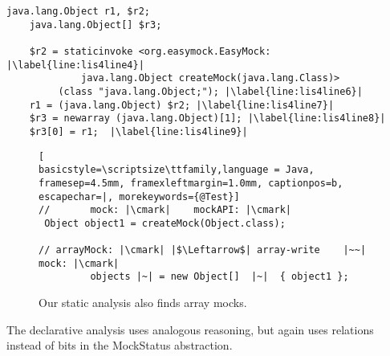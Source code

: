 \begin{lstlisting}[basicstyle=\ttfamily, caption={Jimple Intermediate Representation for the array in Figure~\ref{fig:arrayMockIllustration}.},
basicstyle=\scriptsize\ttfamily, framesep=4.5mm, framexleftmargin=1.0mm, captionpos=b, label=lis:arrayIllustrationIR, escapechar=|, morekeywords={@Test, specialinvoke, virtualinvoke, staticinvoke, newarray}]
	java.lang.Object r1, $r2;
	java.lang.Object[] $r3;
	
	$r2 = staticinvoke <org.easymock.EasyMock: |\label{line:lis4line4}|
	         java.lang.Object createMock(java.lang.Class)>
	     (class "java.lang.Object;"); |\label{line:lis4line6}|
	r1 = (java.lang.Object) $r2; |\label{line:lis4line7}|
	$r3 = newarray (java.lang.Object)[1]; |\label{line:lis4line8}|
	$r3[0] = r1;  |\label{line:lis4line9}|
\end{lstlisting}

\begin{figure}[h]
\begin{lstlisting}[
basicstyle=\scriptsize\ttfamily,language = Java, framesep=4.5mm, framexleftmargin=1.0mm, captionpos=b, escapechar=|, morekeywords={@Test}]
//       mock: |\cmark|    mockAPI: |\cmark|
 Object object1 = createMock(Object.class);

// arrayMock: |\cmark| |$\Leftarrow$| array-write    |~~|  mock: |\cmark|
         objects |~| = new Object[]  |~|  { object1 };
\end{lstlisting}
    
    \caption{Our static analysis also finds array mocks.}
    \label{fig:arrayMockIllustration}
    
\end{figure}

The declarative analysis uses analogous reasoning, but again uses relations instead of bits in the MockStatus abstraction.

